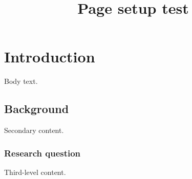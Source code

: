 \documentclass{article}
\title{Page setup test}
\begin{document}
\maketitle
\clearpage
\begingroup
\setcounter{tocdepth}{3}
\renewcommand{\contentsname}{Contents}
\renewcommand{\cfttoctitlefont}{\hfill \fontsize{16pt}{19.2pt}\selectfont \bfseries }
\renewcommand{\cftaftertoctitle}{ \hfill}
\renewcommand{\cftsecleader}{\cftdotfill{\cftdotsep}}
\renewcommand{\cftsubsecleader}{\cftdotfill{\cftdotsep}}
\renewcommand{\cftsubsubsecleader}{\cftdotfill{\cftdotsep}}
\tableofcontents
\endgroup
\clearpage
\section{Introduction}
Body text.
\subsection{Background}
Secondary content.
\subsubsection{Research question}
Third-level content.
\end{document}
